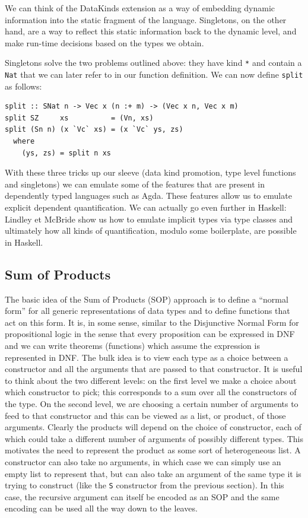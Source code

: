 \documentclass[11pt, titlepage]{article}
\begin{document}
We can think of the DataKinds extension as a way of embedding dynamic information into the static fragment of the language. Singletons, on the other hand, are a way to reflect this static information back to the dynamic level, and make run-time decisions based on the types we obtain.

Singletons solve the two problems outlined above: they have kind \texttt{*} and contain a \texttt{Nat} that we can later refer to in our function definition. We can now define \texttt{split} as follows:

\begin{verbatim}
split :: SNat n -> Vec x (n :+ m) -> (Vec x n, Vec x m)
split SZ     xs          = (Vn, xs)
split (Sn n) (x `Vc` xs) = (x `Vc` ys, zs)
  where
    (ys, zs) = split n xs
\end{verbatim}

With these three tricks up our sleeve (data kind promotion, type level functions and singletons) we can emulate some of the features that are present in dependently typed languages such as Agda. These features allow us to emulate explicit dependent quantification. We can actually go even further in Haskell: Lindley et McBride \cite{hasochism} show us how to emulate implicit types via type classes and ultimately how all kinds of quantification, modulo some boilerplate, are possible in Haskell.

\subsection{Sum of Products}\label{SOP}

The basic idea of the Sum of Products (SOP) approach is to define a ``normal form'' for all generic representations of data types and 
to define functions that act on this form. It is, in some sense, similar to the Disjunctive Normal Form for propositional logic in the sense that every proposition can be expressed in DNF and we can write theorems (functions) which assume the expression is represented in DNF.
The bulk idea is to view each type as a choice between a constructor and all the arguments that are passed to that constructor. It is useful to think about the two different levels: on the first level we make a choice about which constructor to pick; this corresponds to a sum
over all the constructors of the type. On the second level, we are choosing a certain number of arguments to feed to that constructor and this can be viewed as a list, or product, of 
those arguments. Clearly the products will depend on the choice of constructor, 
each of which could take a different number of arguments of possibly 
different types. This motivates the need to represent the product as some sort 
of heterogeneous list. A constructor can also take no arguments, in which case we 
can simply use an empty list to represent that, but can also take an argument of the same type it is trying to construct (like the \texttt{S} constructor from the previous section). 
In this case, the recursive argument can itself be encoded as an SOP and the same encoding can be used all the way down to the leaves. 
\end{document}
